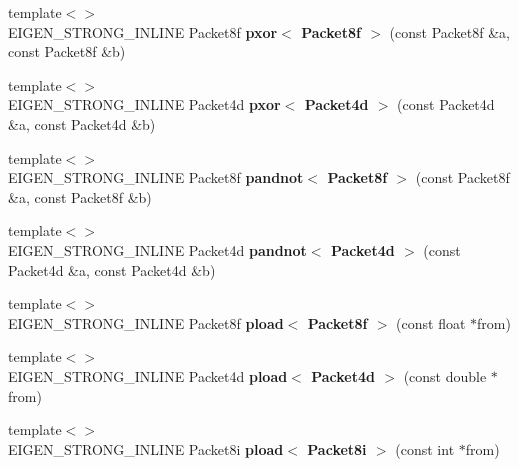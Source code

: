 \begin{DoxyCompactItemize}
{\footnotesize template$<$$>$ }\\E\+I\+G\+E\+N\+\_\+\+S\+T\+R\+O\+N\+G\+\_\+\+I\+N\+L\+I\+NE Packet8f {\bfseries pxor$<$ Packet8f $>$} (const Packet8f \&a, const Packet8f \&b)
\item 
\mbox{\label{namespace_eigen_1_1internal_ad328af2b5139666dc0076a7d14419521}} 
{\footnotesize template$<$$>$ }\\E\+I\+G\+E\+N\+\_\+\+S\+T\+R\+O\+N\+G\+\_\+\+I\+N\+L\+I\+NE Packet4d {\bfseries pxor$<$ Packet4d $>$} (const Packet4d \&a, const Packet4d \&b)
\item 
\mbox{\label{namespace_eigen_1_1internal_a6dcdc099c7ab246c9335f3d940ddd300}} 
{\footnotesize template$<$$>$ }\\E\+I\+G\+E\+N\+\_\+\+S\+T\+R\+O\+N\+G\+\_\+\+I\+N\+L\+I\+NE Packet8f {\bfseries pandnot$<$ Packet8f $>$} (const Packet8f \&a, const Packet8f \&b)
\item 
\mbox{\label{namespace_eigen_1_1internal_af1af001dafa477fce99cd00b5764bce7}} 
{\footnotesize template$<$$>$ }\\E\+I\+G\+E\+N\+\_\+\+S\+T\+R\+O\+N\+G\+\_\+\+I\+N\+L\+I\+NE Packet4d {\bfseries pandnot$<$ Packet4d $>$} (const Packet4d \&a, const Packet4d \&b)
\item 
\mbox{\label{namespace_eigen_1_1internal_a7e80d5c3ef829e320737b8f5367e971e}} 
{\footnotesize template$<$$>$ }\\E\+I\+G\+E\+N\+\_\+\+S\+T\+R\+O\+N\+G\+\_\+\+I\+N\+L\+I\+NE Packet8f {\bfseries pload$<$ Packet8f $>$} (const float $\ast$from)
\item 
\mbox{\label{namespace_eigen_1_1internal_ad1499cbb8aef03333d5fc5c7861839bb}} 
{\footnotesize template$<$$>$ }\\E\+I\+G\+E\+N\+\_\+\+S\+T\+R\+O\+N\+G\+\_\+\+I\+N\+L\+I\+NE Packet4d {\bfseries pload$<$ Packet4d $>$} (const double $\ast$from)
\item 
\mbox{\label{namespace_eigen_1_1internal_a86d3133f145dcad29a971a867d1a02a7}} 
{\footnotesize template$<$$>$ }\\E\+I\+G\+E\+N\+\_\+\+S\+T\+R\+O\+N\+G\+\_\+\+I\+N\+L\+I\+NE Packet8i {\bfseries pload$<$ Packet8i $>$} (const int $\ast$from)

\end{DoxyCompactItemize}
